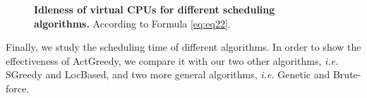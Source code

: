 \begin{figure}
\begin{centering}
\caption{\textbf{Idleness of virtual CPUs for different scheduling algorithms.} According to Formula \ref{eq:eq22}.}\label{fig:idleness}
\end{centering}
\end{figure}

Finally, we study the scheduling time of different algorithms. In order to show the effectiveness of ActGreedy, we compare it with our two other algorithms, \textit{i.e.} SGreedy and LocBased, and two more general algorithms, \textit{i.e.} Genetic and Brute-force. 

